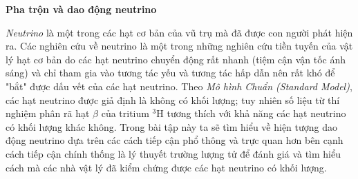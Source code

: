 
\textbf{Pha trộn và dao động neutrino}

\textit{Neutrino} là một trong các hạt cơ bản của vũ trụ mà đã được con người phát hiện ra. Các nghiên cứu về neutrino là một trong những nghiên cứu tiền tuyến của vật lý hạt cơ bản do các hạt neutrino chuyển động rất nhanh (tiệm cận vận tốc ánh sáng) và chỉ tham gia vào tương tác yếu và tương tác hấp dẫn nên rất khó để "bắt" được dấu vết của các hạt neutrino. Theo \textit{Mô hình Chuẩn (Standard Model)}, các hạt neutrino được giả định là không có khối lượng; tuy nhiên số liệu từ thí nghiệm phân rã hạt $\beta$ của tritium $^3\text{H}$ tương thích với khả năng các hạt neutrino có khối lượng khác không. Trong bài tập này ta sẽ tìm hiểu về hiện tượng dao động neutrino dựa trên các cách tiếp cận phổ thông và trực quan hơn bên cạnh cách tiếp cận chính thống là lý thuyết trường lượng tử để đánh giá và tìm hiểu cách mà các nhà vật lý đã kiểm chứng được các hạt neutrino có khối lượng.

